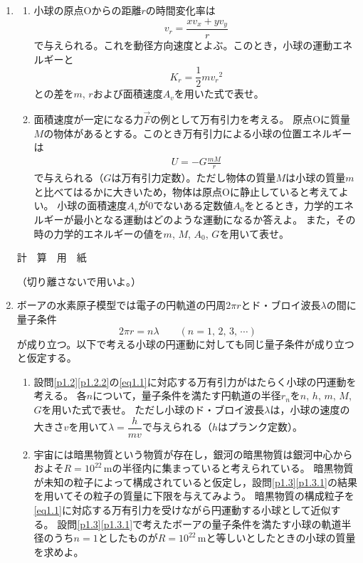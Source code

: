 \documentclass[b5paper, papersize, fleqn, 11pt, dvipdfmx, bold, nodots]{jsarticle}
\begin{document}
\begin{enumerate}[label=\Roman*]
  \newpage

  \item\label{p1.2}
  \begin{enumerate}[label=\Kakko*]
    \item 小球の原点Oからの距離$r$の時間変化率は
    \[v_r=\frac{xv_x+yv_y}{r}\]
    で与えられる。これを動径方向速度とよぶ。このとき，小球の運動エネルギーと
    \[K_r=\frac{1}{2}mv_r{}^2\]
    との差を$m$, $r$および面積速度$A_v$を用いた式で表せ。

    \item\label{p1.2.2} 面積速度が一定になる力$\overrightarrow{F}$の例として万有引力を考える。
    原点Oに質量$M$の物体があるとする。このとき万有引力による小球の位置エネルギーは
    \begin{align}
      U=-G\frac{mM}{r}\label{eq1.1}
    \end{align}
    で与えられる（$G$は万有引力定数）。ただし物体の質量$M$は小球の質量$m$と比べてはるかに大きいため，物体は原点Oに静止していると考えてよい。
    小球の面積速度$A_v$が$0$でないある定数値$A_0$をとるとき，力学的エネルギーが最小となる運動はどのような運動になるか答えよ。
    また，その時の力学的エネルギーの値を$m$, $M$, $A_0$, $G$を用いて表せ。
  \end{enumerate}

  \newpage

  \begin{center}
    {\large 計　算　用　紙}\par
    （切り離さないで用いよ。）
  \end{center}

  \newpage

  \setlength{}
  \item\label{p1.3} ボーアの水素原子模型では電子の円軌道の円周$2\pi r$とド・ブロイ波長$\lambda$の間に量子条件
  \[2\pi r=n\lambda\qquad(n=1,\,2,\,3,\,\cdots)\]
  が成り立つ。以下で考える小球の円運動に対しても同じ量子条件が成り立つと仮定する。

  \begin{enumerate}[label=\Kakko*]
    \item\label{p1.3.1} 設問\ref{p1.2}\ref{p1.2.2}の\eqref{eq1.1}に対応する万有引力がはたらく小球の円運動を考える。
    各$n$について，量子条件を満たす円軌道の半径$r_n$を$n$, $h$, $m$, $M$, $G$を用いた式で表せ。
    ただし小球のド・ブロイ波長$\lambda$は，小球の速度の大きさ$v$を用いて$\lambda=\dfrac{h}{mv}$で与えられる（$h$はプランク定数）。

    \item 宇宙には暗黒物質という物質が存在し，銀河の暗黒物質は銀河中心からおよそ$R=10^{22}$\,mの半径内に集まっていると考えられている。
    暗黒物質が未知の粒子によって構成されていると仮定し，設問\ref{p1.3}\ref{p1.3.1}の結果を用いてその粒子の質量に下限を与えてみよう。
    暗黒物質の構成粒子を\eqref{eq1.1}に対応する万有引力を受けながら円運動する小球として近似する。
    設問\ref{p1.3}\ref{p1.3.1}で考えたボーアの量子条件を満たす小球の軌道半径のうち$n=1$としたものが$R=10^{22}$\,mと等しいとしたときの小球の質量を求めよ。


\end{enumerate}
\end{enumerate}
\end{document}
